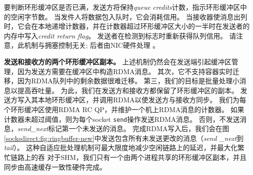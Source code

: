 要判断环形缓冲区是否已满，发送方将保持\textit {queue credits}计数，指示环形缓冲区中的空闲字节数。
当发件人将数据包入队时，它会消耗信用。 当接收器使消息出列时，它会在本地递增计数器，并在计数器超过环形缓冲区大小的一半时在发送者的内存中写入\textit {credit return flag}。 发送者在检测到标志时重新获得队列信用。
请注意，此机制与拥塞控制无关; 后者由NIC硬件处理 \cite {zhu2015congestion}。

\textbf {发送和接收方的两个环形缓冲区副本。}
上述机制仍然会在发送端引起缓冲区管理，因为发送方需要在缓冲区中构造RDMA消息。
其次，它不支持容器实时迁移，因为RDMA队列中的剩余数据很难迁移。
第三，我们的目标是批量处理小消息以提高吞吐量。
为此，我们在发送方和接收方都保留了环形缓冲区的副本。
发送方写入其本地环形缓冲区，并调用RDMA以使发送方与接收方同步。
我们为每个环形缓冲区使用RDMA RC QP，并维护一个机上RDMA消息的计数器。
如果计数器未超过阈值，则为每个socket \texttt {send}操作发送RDMA消息。
否则，不发送消息，\emph {send\_next}标记第一个未发送的消息。
完成RDMA写入后，我们会在图 \ref {socksdirect:fig:ringbuffer-new}中发送包含所有未发送更改的消息（\emph {send \_next}到\emph {tail}）。
这种自适应批处理机制可最大限度地减少空闲链路上的延迟，并最大化繁忙链路上的吞
对于SHM，我们只有一个由两个进程共享的环形缓冲区副本，并且同步由高速缓存一致性硬件完成。



